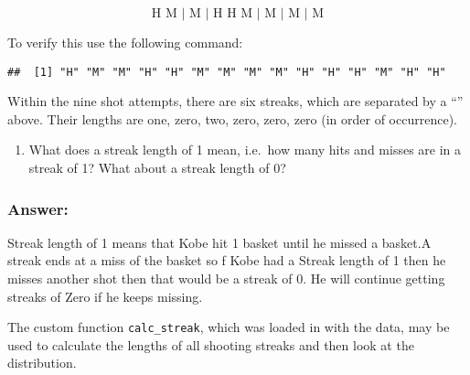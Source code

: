 \documentclass[
]{article}
\newenvironment{Shaded}{\begin{snugshade}}{\end{snugshade}}
\newcommand{\DecValTok}[1]{\textcolor[rgb]{0.00,0.00,0.81}{#1}}
\newcommand{\KeywordTok}[1]{\textcolor[rgb]{0.13,0.29,0.53}{\textbf{#1}}}
\newcommand{\NormalTok}[1]{#1}
\newcommand{\OperatorTok}[1]{\textcolor[rgb]{0.81,0.36,0.00}{\textbf{#1}}}
\newcommand{\StringTok}[1]{\textcolor[rgb]{0.31,0.60,0.02}{#1}}
\providecommand{\tightlist}{%
  \setlength{\itemsep}{0pt}\setlength{\parskip}{0pt}}
\begin{document}
\[ \textrm{H M | M | H H M | M | M | M} \]

To verify this use the following command:

\begin{Shaded}
\end{Shaded}

\begin{verbatim}
##  [1] "H" "M" "M" "H" "H" "M" "M" "M" "M" "H" "H" "H" "M" "H" "H"
\end{verbatim}

Within the nine shot attempts, there are six streaks, which are
separated by a ``\textbar{}'' above. Their lengths are one, zero, two,
zero, zero, zero (in order of occurrence).

\begin{enumerate}
\def\labelenumi{\arabic{enumi}.}
\tightlist
\item
  What does a streak length of 1 mean, i.e.~how many hits and misses are
  in a streak of 1? What about a streak length of 0?
\end{enumerate}

\hypertarget{answer}{%
\subsubsection{Answer:}\label{answer}}

Streak length of 1 means that Kobe hit 1 basket until he missed a
basket.A streak ends at a miss of the basket so f Kobe had a Streak
length of 1 then he misses another shot then that would be a streak of
0. He will continue getting streaks of Zero if he keeps missing.

The custom function \texttt{calc\_streak}, which was loaded in with the
data, may be used to calculate the lengths of all shooting streaks and
then look at the distribution.

\begin{Shaded}
\end{Shaded}
\end{document}
